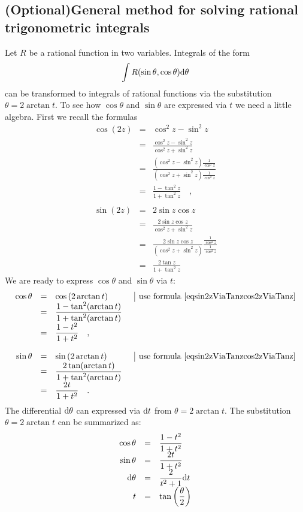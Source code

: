 \documentclass[12pt]{book}
\newcommand{\optionalMaterial}{\textbf{(Optional)}}
\begin{document}
\subsection{\optionalMaterial General method for solving rational trigonometric integrals}\label{secTrigIntegralsWith2Arctan}
Let $R$ be a rational function in two variables. Integrals of the form
\[
\int R(\sin \theta,\cos \theta ){\normalfont \text{d}} \theta
\]
can be transformed to integrals of rational functions via the substitution $\theta= 2\arctan t$. To see how $\cos \theta$ and $\sin \theta$ are expressed via $t$ we need a little algebra. First we recall the formulas
\begin{equation}\label{eqsin2zViaTanzcos2zViaTanz}
\begin{array}{rcll|l}
\cos (2z)&=& \displaystyle \cos^2 z- \sin^{2}z\\
&=&\displaystyle \frac{\cos^{2}z- \sin^{2}z }{ \cos^2z + \sin^2 z}\\
&=&\displaystyle \frac{\left(\cos^{2}z- \sin^{2 } z\right) \frac{1}{\cos^2 z}}{ \left( \cos^2z+\sin^2z \right) \frac{1}{ \cos^2 z}}\\
&=&\displaystyle \frac{1-\tan^2 z}{1+\tan^2z}\quad ,\\~\\
\sin(2z)&=& 2\sin z \cos z\\
&=&\displaystyle \frac{2\sin z \cos z}{\cos^2z+\sin^2z}\\
&=&\displaystyle \frac{2\sin z \cos z}{\left(\cos^2z+\sin^2z\right)} \frac{\frac{ 1}{\cos^2z}}{ \frac{ 1}{\cos^2z}}\\
&=&\displaystyle \frac{2\tan z}{1+\tan^2z}
\end{array}
\end{equation}
We are ready to express $\cos \theta$ and $\sin \theta$ via $t$:
\[
\begin{array}{rcll|l}
\cos \theta&=& \cos \left(2\arctan t\right)&&\text{use formula \eqref{eqsin2zViaTanzcos2zViaTanz}}\\
&=&\displaystyle \frac{1- \tan^2(\arctan t)}{ 1 + \tan^2( \arctan t)}\\
&=&\displaystyle  \frac{1- t^2}{1+t^2}\quad ,\\~\\
\sin \theta&=& \sin \left(2\arctan t\right)&&\text{use formula \eqref{eqsin2zViaTanzcos2zViaTanz}}\\
&=&\displaystyle \frac{2\tan(\arctan t)}{1+\tan^2(\arctan t)}\\
&=&\displaystyle  \frac{2t}{1+t^2}\quad .
\end{array}
\]
The differential ${\normalfont \text{d}} \theta$ can expressed via ${\normalfont \text{d}} t$ from $\theta=2\arctan t$. The substitution $\theta=2\arctan t$ can be summarized as:
\begin{equation}\label{eqTrigIntegralsWeistrassSub}
\begin{array}{rcl}
\cos \theta&=&\displaystyle  \frac{1- t^2}{1+t^2} \\
\sin \theta&=&\displaystyle \frac{2t}{1+t^2}\\
{\normalfont \text{d}} \theta&=&\displaystyle \frac{2}{t^2+1}{\normalfont \text{d}} t \\
t&=&\displaystyle \tan \left(\frac {\theta}{2}\right)
\end{array}
\end{equation}
\end{document}
